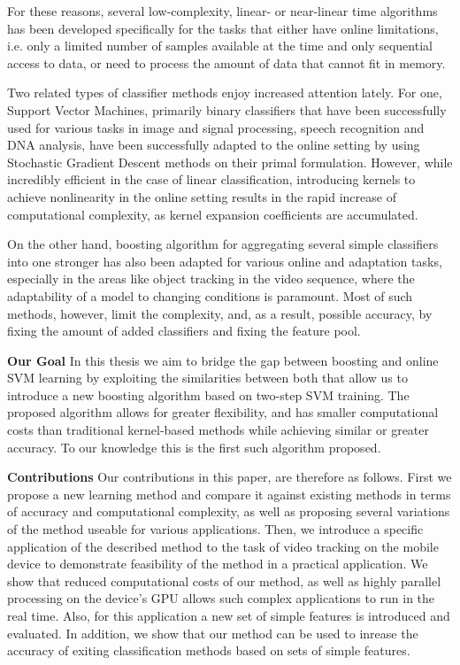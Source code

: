 For these reasons, several low-complexity, linear- or near-linear time algorithms has been developed specifically for the tasks that either have online limitations, i.e. only a limited number of samples available at the time and only sequential access to data, or need to process the amount of data that cannot fit in memory.

Two related types of classifier methods enjoy increased attention lately. For one, Support Vector Machines, primarily binary classifiers that have been successfully used for various tasks in image and signal processing, speech recognition and DNA analysis, have been successfully adapted to the online setting by using Stochastic Gradient Descent methods on their primal formulation. However, while incredibly efficient in the case of linear classification, introducing kernels to achieve nonlinearity in the online setting results in the  rapid increase of computational complexity, as kernel expansion coefficients are accumulated. 

On the other hand, boosting algorithm for aggregating several simple classifiers into one stronger has also been adapted for various online and adaptation tasks, especially in the areas like object tracking in the video sequence, where the adaptability of a model to changing conditions is paramount. Most of such methods, however, limit the complexity, and, as a result, possible accuracy, by fixing the amount of added classifiers and fixing the feature pool. 

{\bf Our Goal} In this thesis we aim to bridge the gap between boosting and online SVM learning by exploiting the similarities between both that allow us to introduce a new boosting algorithm based on two-step SVM training. The proposed algorithm allows for greater flexibility, and has smaller computational costs than traditional kernel-based methods while achieving similar or greater accuracy. To our knowledge this is the first such algorithm proposed. 

{\bf Contributions} Our contributions in this paper, are therefore as follows. First we propose a new learning method and compare it against existing methods in terms of accuracy and computational complexity, as well as proposing several variations of the method useable for various applications. Then, we introduce a specific application of the described method to the task of video tracking on the mobile device to demonstrate feasibility of the method in a practical application. We show that reduced computational costs of our method, as well as highly parallel processing on the device's GPU allows such complex applications to run in the real time. Also, for this application a new set of simple features is introduced and evaluated. In addition, we show that our method can be used to inrease the accuracy of exiting classification methods based on sets of simple features.

